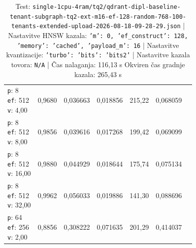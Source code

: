 \begin{table}[htbp]
\begin{tabularx}{\textwidth}{Xrrrrrr}
    \makecell{\texttt{p}: 8\\\texttt{ef}: 512\\\texttt{v}: 4,00} & 0,9680 & 0,036663 & 0,018856 & 215,22 & 0,068059 \\
    \makecell{\texttt{p}: 8\\\texttt{ef}: 512\\\texttt{v}: 8,00} & 0,9856 & 0,039616 & 0,017268 & 199,42 & 0,069099 \\
    \makecell{\texttt{p}: 8\\\texttt{ef}: 512\\\texttt{v}: 16,00} & 0,9880 & 0,044929 & 0,018644 & 175,74 & 0,075134 \\
    \makecell{\texttt{p}: 8\\\texttt{ef}: 512\\\texttt{v}: 32,00} & 0,9962 & 0,056033 & 0,019886 & 141,30 & 0,088696 \\
    \makecell{\texttt{p}: 64\\\texttt{ef}: 256\\\texttt{v}: 2,00} & 0,8856 & 0,308222 & 0,071635 & 201,29 & 0,414037 \\
    \bottomrule
  \end{tabularx}
\caption* {Test: \texttt{single-1cpu-4ram/tq2/qdrant-dipl-baseline-tenant-subgraph-tq2-ext-m16-ef-128-random-768-100-tenants-extended-upload-2026-08-18-09-28-29.json} | Nastavitve HNSW kazala: \texttt{{'m': 0, 'ef\_construct': 128, 'memory': 'cached', 'payload\_m': 16}} | Nastavitve kvantizacije: \texttt{{'turbo': {'bits': 'bits2'}}} | Nastavitve kazala tovora: \texttt{N/A} | Čas nalaganja: 116,13 s Okviren čas gradnje kazala: 265,43 s}\end{table}


